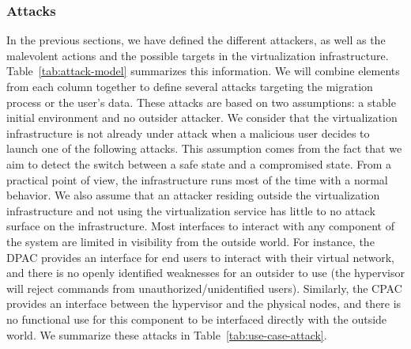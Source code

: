 \subsubsection{Attacks}
\label{sec:model-attacks}
In the previous sections, we have defined the different attackers, as well as the malevolent actions and the possible targets in the virtualization infrastructure. 
Table~\ref{tab:attack-model} summarizes this information.
We will combine elements from each column together to define several attacks targeting the migration process or the user's data.
These attacks are based on two assumptions: a stable initial environment and no outsider attacker.
We consider that the virtualization infrastructure is not already under attack when a malicious user decides to launch one of the following attacks.
This assumption comes from the fact that we aim to detect the switch between a safe state and a compromised state. From a practical point of view, the infrastructure runs most of the time with a normal behavior.
We also assume that an attacker residing outside the virtualization infrastructure and not using the virtualization service has little to no attack surface on the infrastructure.
Most interfaces to interact with any component of the system are limited in visibility from the outside world.
For instance, the DPAC provides an interface for end users to interact with their virtual network, and there is no openly identified weaknesses for an outsider to use (\ie the hypervisor will reject commands from unauthorized/unidentified users).
Similarly, the CPAC provides an interface between the hypervisor and the physical nodes, and there is no functional use for this component to be interfaced directly with the outside world.
We summarize these attacks in Table~\ref{tab:use-case-attack}.

